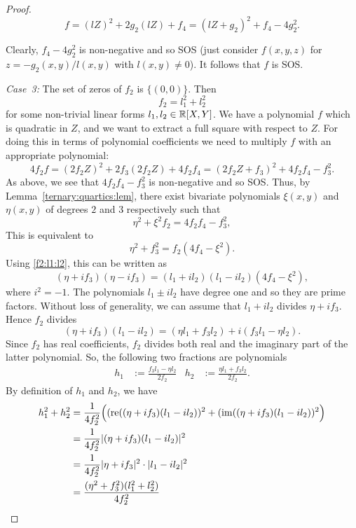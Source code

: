 \begin{proof}
	\[
		f = (l Z)^2 + 2 g_2 (l Z) + f_4 = (l Z + g_2)^2 + f_4 - 4 g_2^2. 
	\]
	
	Clearly, $f_4 - 4 g_2^2$ is non-negative and so SOS (just consider $f(x,y,z)$ for $z= - g_2(x,y) / l(x,y)$ with $l(x,y) \ne 0$). It follows that $f$ is SOS. 
	
	\emph{Case~3:} The set of zeros of $f_2$ is $\{(0,0)\}$. Then 
	\begin{equation}
		\label{f2:l1:l2}
		f_2 = l_1^2 + l_2^2
	\end{equation} 
	for some non-trivial linear forms $l_1, l_2 \in \mathbb{R}[X,Y]$. We have a polynomial $f$ which is quadratic in $Z$, and we want to extract a full square with respect to $Z$. For doing this in terms of polynomial coefficients we need to multiply $f$ with an appropriate polynomial: 
	\[
		4 f_2 f = (2 f_2 Z)^2 + 2 f_3 ( 2 f_2 Z) + 4 f_2 f_4 = (2 f_2 Z + f_3)^2 + 4 f_2 f_4 - f_3^2.
	\]
	As above, we see that $4 f_2 f_4 - f_3^2$ is non-negative and so SOS. Thus, by Lemma~\ref{ternary:quartics:lem}, there exist bivariate polynomials $\xi(x,y)$ and $\eta(x,y)$ of degrees $2$ and $3$ respectively such that 
	\[
		\eta^2 + \xi^2 f_2 = 4 f_2 f_4 - f_3^2,
	\] 
	This is equivalent to
	\begin{equation}
		\label{eta:f3}
		\eta^2 +f_3^2 = f_2 (4 f_4 - \xi^2). 
	\end{equation}
	Using \eqref{f2:l1:l2}, this can be written as 
	\[
	(\eta + i f_3)(\eta - i f_3) = (l_1 + i l_2) (l_1 - i l_2)( 4 f_4 - \xi^2),
	\]
	where $i^2 = -1$. The polynomials $l_1 \pm i l_2$ have degree one and so they are prime factors. Without loss of generality, we can assume that $l_1 + i l_2$ divides $\eta + i f_3$. Hence $f_2$ divides 
	\[
		(\eta+ i f_3) (l_1 - i l_2) = (\eta l_1 + f_3 l_2) + i ( f_3 l_1 - \eta l_2).
	\]
	Since $f_2$ has real coefficients, $f_2$ divides both real and the imaginary part of the latter polynomial. So, the following two fractions are polynomials
	\begin{align*}
		h_1 & := \frac{f_3 l_1 - \eta l_2}{2 f_2} &  h_2 &:= \frac{\eta l_1 + f_3 l_2}{2 f_2}.
	\end{align*}
	By definition of $h_1$ and $h_2$, we have 
	\begin{align*}
		h_1^2 + h_2^2 & = \frac{1}{4 f_2^2} \Bigl((\re ((\eta+i f_3)(l_1-il_2))^2 +  (\im ((\eta+ i f_3)(l_1 - i l_2))^2 \Bigr) 
		\\ & = \frac{1}{4 f_2^2}|(\eta+ i f_3)(l_1 - i l_2)|^2 
		\\ & = \frac{1}{4 f_2^2}|\eta+ i f_3|^2 \cdot |l_1 - i l_2|^2
		\\ & = \frac{(\eta^2 + f_3^2)(l_1^2 + l_2^2)}{4 f_2^2} 

\end{align*}
\end{proof}
